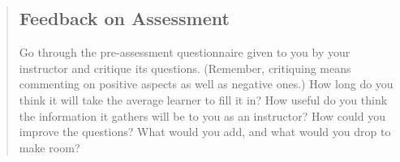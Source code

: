 \begin{quotation}   %
\subsection*{Feedback on Assessment}

Go through the pre-assessment questionnaire given to you by your instructor
and critique its questions.
(Remember, critiquing means commenting on positive aspects as well as negative ones.)
How long do you think it will take the average learner to fill it in?
How useful do you think the information it gathers will be to you as an instructor?
How could you improve the questions?
What would you add, and what would you drop to make room?
\end{quotation}   %
